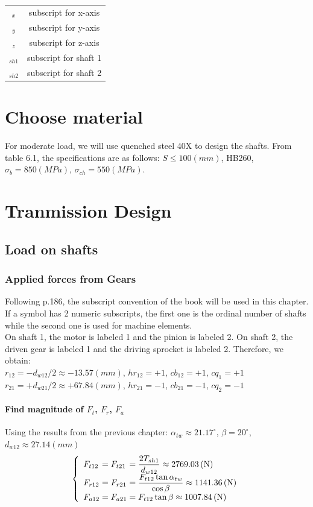 \begin{tabular}{cc}
	$ _x $ & subscript for x-axis\\
	$ _y $ & subscript for y-axis\\
	$ _z $ & subscript for z-axis\\
	$ _{sh1} $ & subscript for shaft 1\\
	$ _{sh2} $ & subscript for shaft 2\\
\end{tabular}
\section{Choose material}
For moderate load, we will use quenched steel 40X to design the shafts. From table 6.1, the specifications are as follows: $ S \leq 100\unit{(mm)} $, HB260, $ \sigma_b = 850\unit{(MPa)}$, $ \sigma_{ch} = 550\unit{(MPa)}$. 

\section{Tranmission Design}
\subsection{Load on shafts}
\subsubsection{Applied forces from Gears}
Following p.186, the subscript convention of the book will be used in this chapter. If a symbol has 2 numeric subscripts, the first one is the ordinal number of shafts while the second one is used for machine elements.\\
On shaft 1, the motor is labeled 1 and the pinion is labeled 2. On shaft 2, the driven gear is labeled 1 and the driving sprocket is labeled 2. Therefore, we obtain:\\
$ r_{12} = -d_{w12}/2 \approx -13.57\unit{(mm)}$, $ hr_{12} = +1 $, $ cb_{12} = +1 $, $ cq_1 = +1 $\\
$ r_{21} = +d_{w21}/2 \approx +67.84\unit{(mm)}$, $ hr_{21} = -1 $, $ cb_{21} = -1$, $ cq_2 = -1$
\paragraph{Find magnitude of $ F_{t} $, $ F_r $, $ F_a $}
Using the results from the previous chapter: $ \alpha_{tw} \approx 21.17^\circ $, $ \beta = 20^\circ $, $ d_{w12}\approx 27.14\unit{(mm)} $
\[
\left\{ 
\begin{array}{l@{{}={}}l@{{}={}}l}
F_{t12}& F_{t21}& \dfrac{2T_{sh1}}{d_{w12}}\approx 2769.03\unit{(N)}\\
F_{r12}& F_{r21}&  \dfrac{F_{t12}\tan\alpha_{tw}}{\cos\beta}\approx1141.36\unit{(N)}\\
F_{a12}& F_{a21}& F_{t12}\tan\beta\approx1007.84\unit{(N)}\\ 
\end{array}
\right.
\]
